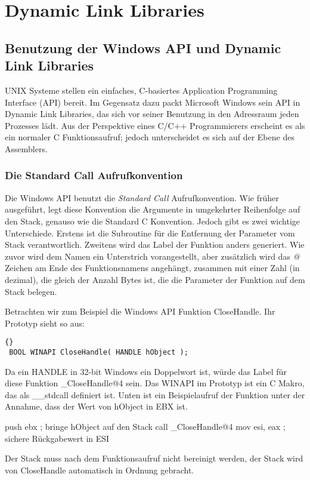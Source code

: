 \chapter{Dynamic Link Libraries}

\section[Benutzung der Windows API und DLLs]{Benutzung der Windows
API und Dynamic Link Libraries}

UNIX Systeme stellen ein einfaches, C-basiertes Application
Programming Interface (API)  bereit. Im Gegensatz dazu
packt Microsoft Windows\texttrademark \hspace{0.2em} sein API in
Dynamic Link Libraries, das sich vor seiner Benutzung in den
Adressraum jeden Prozesses l\"{a}dt. Aus der Perspektive eines C/C++
Programmierers erscheint es als ein normaler C Funktionsaufruf;
jedoch unterscheidet es sich auf der Ebene des Assemblers.

\subsection{Die Standard Call Aufruf\/konvention}
Die Windows API benutzt die \emph{Standard Call}
 Aufruf\/konvention. Wie
fr\"{u}her ausgef\"{u}hrt, legt diese Konvention die Argumente in
umgekehrter Reihenfolge auf den Stack, genauso wie die Standard C
Konvention. Jedoch gibt es zwei wichtige Unterschiede. Erstens ist
die Subroutine f\"{u}r die Entfernung der Parameter vom Stack
verantwortlich. Zweitens wird das Label der Funktion anders
generiert. Wie zuvor wird dem Namen ein Unterstrich vorangestellt,
aber zus\"{a}tzlich wird das \emph{@} Zeichen am Ende des
Funktionsnamens angeh\"{a}ngt, zusammen mit einer Zahl (in dezimal), die
gleich der Anzahl Bytes ist, die die Parameter der Funktion auf dem
Stack belegen.

 Betrachten wir zum Beispiel die Windows API
Funktion {\code CloseHandle}. Ihr Prototyp sieht so aus:
\begin{lstlisting}[stepnumber=0]{}
 BOOL WINAPI CloseHandle( HANDLE hObject );
\end{lstlisting}
Da ein {\code HANDLE} in 32-bit Windows ein Doppelwort ist, w\"{u}rde
das Label f\"{u}r diese Funktion {\code \_CloseHandle@4} sein. Das
{\code WINAPI}  im Prototyp ist ein C Makro, das als
{\code \_\_stdcall} definiert ist. Unten ist ein Beispielaufruf der
Funktion unter der Annahme, dass der Wert von {\code hObject} in
{\code EBX} ist.
\begin{AsmCodeListing}[frame=single, numbers=left, commandchars=\\\{\}]
     push  ebx                ; bringe hObject auf den Stack
     call  _CloseHandle@4
     mov   esi, eax           ; sichere R\"{u}ckgabewert in ESI
\end{AsmCodeListing}
Der Stack muss nach dem Funktionsaufruf nicht bereinigt werden, der
Stack wird von {\code CloseHandle} automatisch in Ordnung gebracht.

